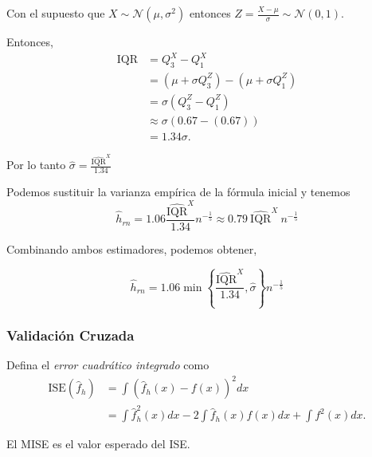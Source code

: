 \documentclass[12pt]{book}\usepackage[]{graphicx}\usepackage[]{color}
\theoremstyle{definition}
\theoremstyle{plain}
\begin{document}
Con el supuesto que \(X\sim \mathcal{N}(\mu,\sigma^{2})\) entonces \(\displaystyle Z = \frac{X-\mu}{\sigma} \sim \mathcal{N}(0,1)\).

Entonces,
\begin{align*}
	\mathrm{IQR}
	  & = Q^{X}_{3} - Q^{X}_{1}                                                     \\
	  & = \left( \mu+\sigma Q^{Z}_{3} \right) - \left( \mu+\sigma Q^{Z}_{1} \right) \\
	  & = \sigma \left(Q^{Z}_{3} - Q^{Z}_{1} \right)                                \\
	  & \approx \sigma \left( 0.67 - (0.67) \right)                                 \\
	  & =1.34 \sigma.
\end{align*}

Por lo tanto \(\displaystyle \hat{\sigma} = \frac{\widehat{\mathrm{IQR}}^{X}}{1.34}\)

Podemos sustituir la varianza empírica de la fórmula inicial y tenemos
\begin{equation*}
	\hat{h}_{rn} = 1.06 \frac{\widehat{\mathrm{IQR}}^{X}}{1.34} n^{-\frac{1}{5}} \approx 0.79\  \widehat{\mathrm{IQR}}^{X}\ n^{-\frac{1}{5}}
\end{equation*}

Combinando ambos estimadores, podemos obtener,

\begin{equation*}
	\hat{h}_{rn} = 1.06 \min \left\{\frac{\widehat{\mathrm{IQR}}^{X}}{1.34}, \hat{\sigma }\right\} n^{-\frac{1}{5}}
\end{equation*}

\newpage

\subsubsection{Validación Cruzada}

Defina el \emph{error cuadrático integrado} como
\begin{align*}
	\mathrm{ISE}(\hat{f}_{h}) & =\int\left(\hat{f}_{h}(x)-f(x)\right)^{2}dx\nonumber                   \\
	                          & =\int \hat{f}_{h}^{2}(x)dx-2\int \hat{f}_{h}(x)f(x)dx+\int f^{2}(x)dx.
\end{align*}

\begin{nota}{}{}
	El MISE es el valor esperado del ISE.
\end{nota}
\end{document}
